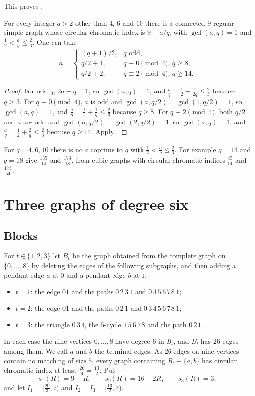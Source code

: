 \documentclass[11pt,colorlinks]{charlie}
\begin{document}
This proves .

\begin{corollary}\label{cor:denominators}
For every integer $q>2$ other than $4$, $6$ and $10$ there is a connected $9$-regular simple graph whose circular chromatic index is $9+a/q$, with $\gcd(a,q)=1$ and $\frac12<\frac aq\le\frac23$. One can take
\[
a=\begin{cases}(q+1)/2,& q\text{ odd},\\ q/2+1,& q\equiv0\pmod4,\ q\ge8,\\ q/2+2,& q\equiv2\pmod4,\ q\ge14.\end{cases}
\]
\end{corollary}

\begin{proof}
For odd $q$, $2a-q=1$, so $\gcd(a,q)=1$, and $\frac aq=\frac12+\frac1{2q}\le\frac23$ because $q\ge3$. For $q\equiv0\pmod4$, $a$ is odd and $\gcd(a,q/2)=\gcd(1,q/2)=1$, so $\gcd(a,q)=1$, and $\frac aq=\frac12+\frac1q\le\frac23$ because $q\ge8$. For $q\equiv2\pmod4$, both $q/2$ and $a$ are odd and $\gcd(a,q/2)=\gcd(2,q/2)=1$, so $\gcd(a,q)=1$, and $\frac aq=\frac12+\frac2q\le\frac23$ because $q\ge14$. Apply .
\end{proof}

For $q=4,6,10$ there is no $a$ coprime to $q$ with $\frac12<\frac aq\le\frac23$. For example $q=14$ and $q=18$ give $\frac{135}{14}$ and $\frac{173}{18}$, from cubic graphs with circular chromatic indices $\frac{45}{14}$ and $\frac{173}{54}$.

\section{Three graphs of degree six}\label{sec:six}

\subsection{Blocks}
For $t\in\{1,2,3\}$ let $B_t$ be the graph obtained from the complete graph on $\{0,\dots,8\}$ by deleting the edges of the following subgraphs, and then adding a pendant edge $a$ at $0$ and a pendant edge $b$ at $1$:
\begin{itemize}
\item $t=1$: the edge $01$ and the paths $0\,2\,3\,1$ and $0\,4\,5\,6\,7\,8\,1$;
\item $t=2$: the edge $01$ and the paths $0\,2\,1$ and $0\,3\,4\,5\,6\,7\,8\,1$;
\item $t=3$: the triangle $0\,3\,4$, the $5$-cycle $1\,5\,6\,7\,8$ and the path $0\,2\,1$.
\end{itemize}
In each case the nine vertices $0,\dots,8$ have degree $6$ in $B_t$, and $B_t$ has $26$ edges among them. We call $a$ and $b$ the terminal edges. As $26$ edges on nine vertices contain no matching of size $5$, every graph containing $B_t-\{a,b\}$ has circular chromatic index at least $\frac{26}{4}=\frac{13}{2}$. Put
\[
s_1(R)=9-R,\qquad s_2(R)=16-2R,\qquad s_3(R)=3,
\]
and let $I_1=[\frac{20}{3},7)$ and $I_2=I_3=[\frac{13}{2},7)$.
\end{document}
